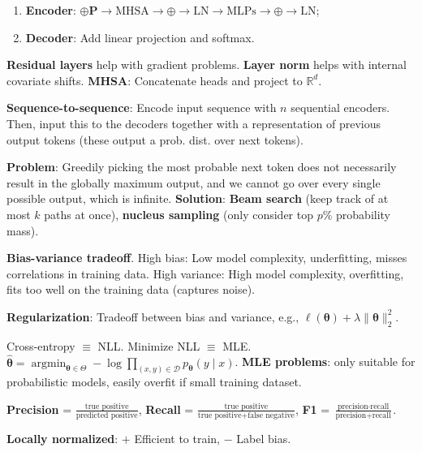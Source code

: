 \documentclass{article}
\DeclareMathOperator*{\argmin}{argmin} %
\newenvironment{topic}[1]
{\begin{tcolorbox}[
  title=#1,
  breakable,
  colback=white,
  colframe=black,
  fonttitle={\bfseries\sffamily},
  sharp corners,
  boxrule=0.5pt,
  boxsep=0.1cm,
  top=0cm,
  bottom=0cm,
  left=0.1cm,
  right=0.1cm,
  enhanced jigsaw,
]}
{\end{tcolorbox}}
\begin{document}
\begin{multicols}{3}
\begin{topic}{Transformers}
  \begin{enumerate}
    \item \textbf{Encoder}: $\oplus \bm{P} \to \mathrm{MHSA} \to \oplus
      \to \mathrm{LN} \to \mathrm{MLPs} \to \oplus \to \mathrm{LN}$;
    \item \textbf{Decoder}: Add linear projection and softmax.
  \end{enumerate}
  \textbf{Residual layers} help with gradient problems. \textbf{Layer norm}
  helps with internal covariate shifts. \textbf{MHSA}: Concatenate heads and
  project to $\mathbb{R}^d$.

  \textbf{Sequence-to-sequence}: Encode input sequence with $n$ sequential
  encoders. Then, input this to the decoders together with a representation of
  previous output tokens (these output a prob. dist. over next tokens).

  \textbf{Problem}: Greedily picking the most probable next token does not
  necessarily result in the globally maximum output, and we cannot go over
  every single possible output, which is infinite. \textbf{Solution}:
  \textbf{Beam search} (keep track of at most $k$ paths at once),
  \textbf{nucleus sampling} (only consider top $p\%$ probability mass).
\end{topic}

\begin{topic}{Axes of modelling}
  \textbf{Bias-variance tradeoff}. High bias: Low model complexity,
  underfitting, misses correlations in training data. High variance: High model
  complexity, overfitting, fits too well on the training data (captures noise).

  \textbf{Regularization}: Tradeoff between bias and variance, e.g.,
  $\ell(\bm{\theta}) + \lambda \| \bm{\theta} \|_2^2$.

  Cross-entropy $\equiv$ NLL. Minimize NLL $\equiv$ MLE. $\hat{\bm{\theta}} =
  \argmin_{\bm{\theta}\in\Theta} -\log \prod_{(x,y)\in\mathcal{D}}
  p_{\bm{\theta}}(y\mid x)$.
  \textbf{MLE problems}: only suitable for probabilistic models, easily
  overfit if small training dataset.

  \textbf{Precision} = $\frac{\text{true positive}}{\text{predicted
  positive}}$, \textbf{Recall} = $\frac{\text{true positive}}{\text{true
  positive} + \text{false negative}}$, \textbf{F1} =
  $\frac{\text{precision}\cdot\text{recall}}{\text{precision}+\text{recall}}$.

  \textbf{Locally normalized}: $+$ Efficient to train, $-$ Label bias.


\end{topic}
\end{multicols}
\end{document}
